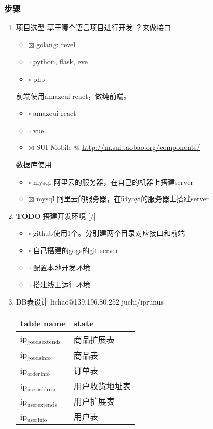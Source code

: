 \documentclass[11pt]{article}
\begin{document}
\subsubsection{步骤}
\label{sec:org11f0a8c}
\begin{enumerate}
\item 项目选型
\label{sec:orga7df05b}
基于哪个语言项目进行开发 ？来做接口
\begin{itemize}
\item $\boxtimes$ golang: revel
\item $\square$ python, flask, eve
\item $\square$ php
\end{itemize}
前端使用amazeui react，做纯前端。
\begin{itemize}
\item $\square$ amazeui react
\item $\square$ vue
\item $\boxtimes$ SUI Mobile @ \url{http://m.sui.taobao.org/components/}
\end{itemize}
数据库使用
\begin{itemize}
\item $\square$ mysql 阿里云的服务器，在自己的机器上搭建server
\item $\boxtimes$ mysql 阿里云的服务器，在54yayi的服务器上搭建server
\end{itemize}



\item {\bfseries\sffamily TODO} 搭建开发环境 [/]
\label{sec:orgedb638d}
\begin{itemize}
\item $\square$ github使用1个。分别建两个目录对应接口和前端
\item $\square$ 自己搭建的gogs的git server
\item $\square$ 配置本地开发环境
\item $\square$ 搭建线上运行环境
\end{itemize}
\item DB表设计
\label{sec:org72866da}
lichao@139.196.80.252 juchi/iprunus
\begin{center}
\begin{tabular}{ll}
table name & state\\
\hline
ip\(_{\text{goods}}\)\(_{\text{extends}}\) & 商品扩展表\\
ip\(_{\text{goods}}\)\(_{\text{info}}\) & 商品表\\
ip\(_{\text{order}}\)\(_{\text{info}}\) & 订单表\\
ip\(_{\text{user}}\)\(_{\text{address}}\) & 用户收货地址表\\
ip\(_{\text{user}}\)\(_{\text{extends}}\) & 用户扩展表\\
ip\(_{\text{user}}\)\(_{\text{info}}\) & 用户表\\
\end{tabular}
\end{center}
\end{enumerate}
\end{document}
